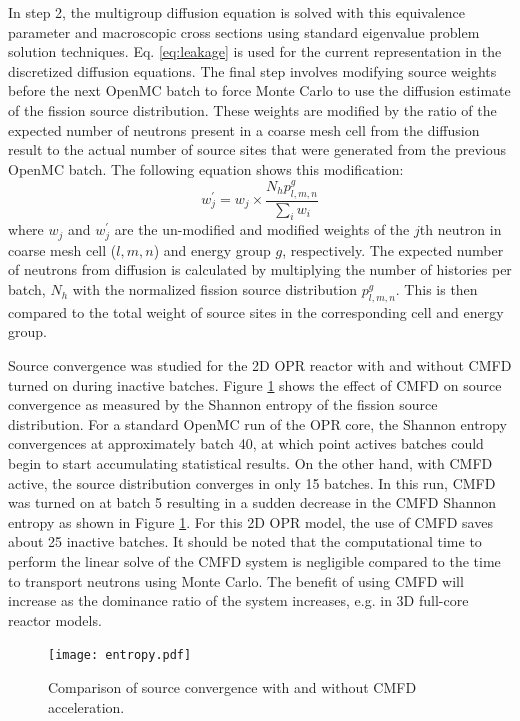 \documentclass{ansconf}
\begin{document}
In step 2, the multigroup diffusion equation is solved with this equivalence
parameter and macroscopic cross sections using standard eigenvalue problem
solution techniques. Eq. \eqref{eq:leakage} is used for the current
representation in the discretized diffusion equations. The final step involves
modifying source weights before the next OpenMC batch to force Monte Carlo to
use the diffusion estimate of the fission source distribution. These weights are
modified by the ratio of the expected number of neutrons present in a coarse
mesh cell from the diffusion result to the actual number of source sites that
were generated from the previous OpenMC batch. The following equation shows this
modification:
\begin{equation}
  \label{eq:weight}
  w_{j}^{\prime} = w_{j} \times \frac{N_{h}p_{l,m,n}^{g}}{\sum_{i}w_{i}}
\end{equation}
where $w_{j}$ and $w_{j}^{\prime}$ are the un-modified and modified weights of
the $j$th neutron in coarse mesh cell ($l,m,n$) and energy group $g$,
respectively. The expected number of neutrons from diffusion is calculated by
multiplying the number of histories per batch, $N_{h}$ with the normalized
fission source distribution $p_{l,m,n}^{g}$. This is then compared to the total
weight of source sites in the corresponding cell and energy group.

Source convergence was studied for the 2D OPR reactor with and without CMFD
turned on during inactive batches.  Figure \ref{fig:cmfd} shows the effect of
CMFD on source convergence as measured by the Shannon entropy of the fission
source distribution. For a standard OpenMC run of the OPR core, the Shannon
entropy convergences at approximately batch 40, at which point actives batches
could begin to start accumulating statistical results. On the other hand, with
CMFD active, the source distribution converges in only 15 batches. In this run,
CMFD was turned on at batch 5 resulting in a sudden decrease in the CMFD Shannon
entropy as shown in Figure \ref{fig:cmfd}. For this 2D OPR model, the use of
CMFD saves about 25 inactive batches. It should be noted that the computational
time to perform the linear solve of the CMFD system is negligible compared to
the time to transport neutrons using Monte Carlo. The benefit of using CMFD will
increase as the dominance ratio of the system increases, e.g. in 3D full-core
reactor models.

\begin{figure}[!t]
  \centering
  \texttt{[image: entropy.pdf]}
  \caption{Comparison of source convergence with and without CMFD acceleration.}
  \label{fig:cmfd}
\end{figure}  
\end{document}
